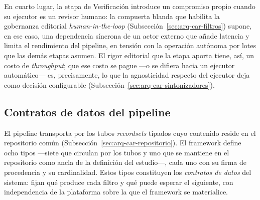 \documentclass[12pt]{report}
\begin{document}
En cuarto lugar, la etapa de Verificación introduce un compromiso propio cuando su ejecutor es un revisor humano: la compuerta blanda que habilita la gobernanza editorial \textit{human-in-the-loop} (Subsección~\ref{sec:arq-car-filtros}) supone, en ese caso, una dependencia síncrona de un actor externo que añade latencia y limita el rendimiento del pipeline, en tensión con la operación autónoma por lotes que las demás etapas asumen. El rigor editorial que la etapa aporta tiene, así, un costo de \textit{throughput}; que ese costo se pague ---o se difiera hacia un ejecutor automático--- es, precisamente, lo que la agnosticidad respecto del ejecutor deja como decisión configurable (Subsección~\ref{sec:arq-car-sintonizadores}).

\subsection{Contratos de datos del pipeline}
\label{sec:arq-car-contratos}

El pipeline transporta por los tubos \textit{recordsets} tipados cuyo contenido reside en el repositorio común (Subsección~\ref{sec:arq-car-repositorio}). El framework define ocho tipos ---siete que circulan por los tubos y uno que se mantiene en el repositorio como ancla de la definición del estudio---, cada uno con su firma de procedencia y su cardinalidad. Estos tipos constituyen los \textit{contratos de datos} del sistema: fijan qué produce cada filtro y qué puede esperar el siguiente, con independencia de la plataforma sobre la que el framework se materialice.
\end{document}
